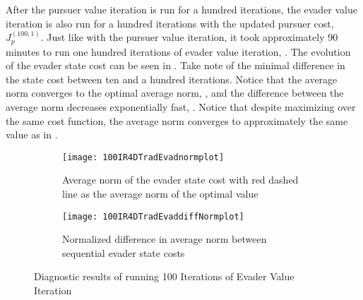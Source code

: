 After the pursuer value iteration is run for a hundred iterations, the evader value iteration is also run for a hundred iterations with the updated pursuer cost, $J^{(100,1)}_p$. Just like with the pursuer value iteration, it took approximately 90 minutes to run one hundred iterations of evader value iteration, . The evolution of the evader state cost can be seen  in . Take note of the minimal difference in the state cost between ten and a hundred iterations. Notice that the average norm converges to the optimal average norm, , and the difference between the average norm decreases exponentially fast, . Notice that despite maximizing over the same cost function, the average norm converges to approximately the same value as in .
\begin{figure}[h!]
\centering
\begin{subfigure}[t]{0.475\textwidth}
	\centering
	\texttt{[image: 100IR4DTradEvadnormplot]}
	\caption{Average norm of the evader state cost with red dashed line as the average norm of the optimal value}
	\label{100IR4DTEnp}
\end{subfigure}
\hfill
\begin{subfigure}[t]{0.475\textwidth}
	\centering
	\texttt{[image: 100IR4DTradEvaddiffNormplot]}
	\caption{Normalized difference in average norm between sequential evader state costs}
	\label{100IR4DTEdnp}
\end{subfigure}
\caption{Diagnostic results of running 100 Iterations of Evader Value Iteration}
\label{100IR4DTEdiag}
\end{figure}  

